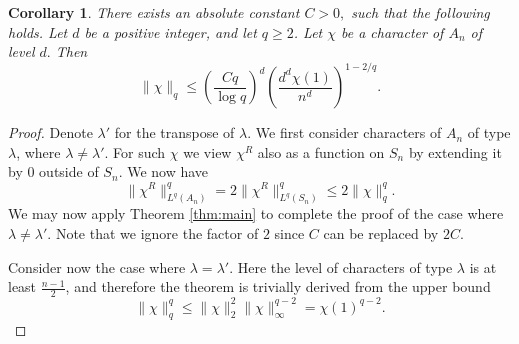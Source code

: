 \documentclass[11pt, letterpaper]{amsart}
\newtheorem{cor}[thm]{Corollary}
\renewcommand\ge{\geqslant}
\renewcommand\le{\leqslant}
\begin{document}
\begin{cor}\label{cor:of thm main}
There exists an absolute constant $C>0,$ such that the following holds. 
Let $d$ be a positive integer, and let $q\ge 2$. Let $\chi$ be a character of $A_n$ of level $d.$
Then 
\[
\| \chi \|_q \le \left( \frac{Cq}{\log q} \right)^d\left(\frac{d^d \chi(1)}{n^d}\right)^{1-2/q}. 
\]
\end{cor}
\begin{proof}
    Denote $\lambda'$ for the transpose of $\lambda$. We first consider characters of $A_n$ of type $\lambda$, where $\lambda \ne \lambda'$. For such $\chi$ we view $\chi^R$ also as a function on $S_n$ by extending it by 0 outside of $S_n.$  We now have \[\|\chi^{R}\|_{L^q(A_n)}^q = 2\|\chi^R\|_{L^q(S_n)}^{q} \le 2\|\chi\|_q^q .\]
We may now apply Theorem \ref{thm:main} to complete the proof of the case where $\lambda\ne \lambda'$. Note that we ignore the factor of $2$ since $C$ can be replaced by $2C$. 

Consider now the case where $\lambda = \lambda'$. Here the level of characters of type $\lambda$ is at least $\frac{n-1}{2}$, and therefore the theorem is trivially derived from the upper bound \[\|\chi\|_q^q\le \|\chi\|_2^2\|\chi\|_{\infty}^{q-2} =\chi(1)^{q-2}.\]  
\end{proof}
\end{document}
